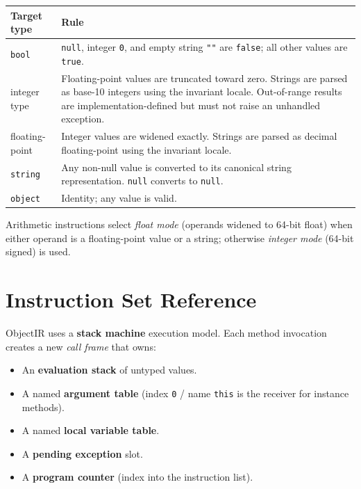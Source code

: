 \documentclass[11pt,a4paper]{article}
\begin{document}
\begin{longtable}{lp{9.5cm}}
  \toprule
  \textbf{Target type} & \textbf{Rule} \\
  \midrule
  \endhead
  \texttt{bool}      &
    \texttt{null}, integer \texttt{0}, and empty string \texttt{""} are
    \texttt{false}; all other values are \texttt{true}. \\
  integer type       &
    Floating-point values are truncated toward zero. Strings are parsed
    as base-10 integers using the invariant locale. Out-of-range results
    are implementation-defined but must not raise an unhandled exception. \\
  floating-point     &
    Integer values are widened exactly. Strings are parsed as decimal
    floating-point using the invariant locale. \\
  \texttt{string}    &
    Any non-null value is converted to its canonical string representation.
    \texttt{null} converts to \texttt{null}. \\
  \texttt{object}    &
    Identity; any value is valid. \\
  \bottomrule
\end{longtable}

Arithmetic instructions select \emph{float mode} (operands widened to
64-bit float) when either operand is a floating-point value or a string;
otherwise \emph{integer mode} (64-bit signed) is used.

\section{Instruction Set Reference}
\label{sec:isa}

ObjectIR uses a \textbf{stack machine} execution model. Each method
invocation creates a new \emph{call frame} that owns:

\begin{itemize}[leftmargin=1.8em, noitemsep]
  \item An \textbf{evaluation stack} of untyped values.
  \item A named \textbf{argument table} (index \texttt{0} / name
    \texttt{this} is the receiver for instance methods).
  \item A named \textbf{local variable table}.
  \item A \textbf{pending exception} slot.
  \item A \textbf{program counter} (index into the instruction list).
\end{itemize}
\end{document}
